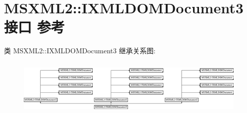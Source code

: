 \hypertarget{interface_m_s_x_m_l2_1_1_i_x_m_l_d_o_m_document3}{}\section{M\+S\+X\+M\+L2\+:\+:I\+X\+M\+L\+D\+O\+M\+Document3接口 参考}
\label{interface_m_s_x_m_l2_1_1_i_x_m_l_d_o_m_document3}
类 M\+S\+X\+M\+L2\+:\+:I\+X\+M\+L\+D\+O\+M\+Document3 继承关系图\+:\begin{figure}[H]
\begin{center}
\leavevmode
\includegraphics[height=2.772277cm]{interface_m_s_x_m_l2_1_1_i_x_m_l_d_o_m_document3}
\end{center}
\end{figure}
